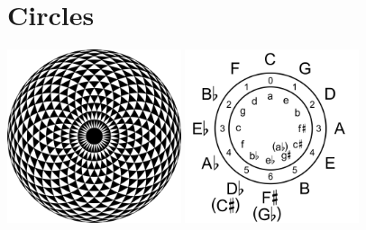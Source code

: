 \documentclass[twoside,10pt]{book}
\begin{document}
    \section{Circles}
      \begin{center}
         \hfill
         \includegraphics[width=0.382\textwidth]{mandala-illusion_transparent_bg_1280px.png}
         \hfill
         \includegraphics[width=0.382\textwidth]{Circle_fifths_transparent_bg_2000px.png}
         \hfill
      \end{center}

  
  \clearpage
\end{document}
